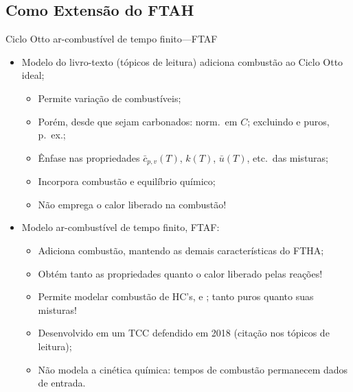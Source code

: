 \subsection{Como Extensão do FTAH}

    \begin{frame}{Ciclo Otto ar-combustível de tempo finito---FTAF}\vspace*{-2em}
        \begin{itemize}
            \item<1->  Modelo do livro-texto (tópicos de leitura) adiciona \alert{combustão} ao
                \alert{Ciclo Otto ideal};
            \begin{itemize}
                \item<2->  Permite variação de \alert{combustíveis};
                \item<3->  Porém, desde que sejam \alert{carbonados}: norm.~em $C$;
                    \alert{excluindo } e \alert{} puros, p.~ex.;
                \item<3->  Ênfase nas \alert{propriedades} $\bar{c}_{p,v}(T)$, $k(T)$,
                    $\bar{u}(T)$, etc.~das misturas;
                \item<4->  Incorpora \alert{combustão} e \alert{equilíbrio químico};
                \item<5->  \alert{Não emprega} o calor liberado na \alert{combustão}!
            \end{itemize}
            \item<6->  Modelo \alert{ar-combustível de tempo finito, FTAF}:
            \begin{itemize}
                \item<7->  Adiciona \alert{combustão}, mantendo as demais características do
                    \alert{FTHA};
                \item<8->  Obtém tanto as \alert{propriedades} quanto o \alert{calor liberado}
                    pelas \alert{reações}!
                \item<9->  \alert{Permite} modelar combustão de \alert{HC's}, \alert{} e
                    \alert{}; tanto \alert{puros} quanto suas \alert{misturas}!
                \item<10-> Desenvolvido em um \alert{TCC} defendido em \alert{2018} (citação nos
                    tópicos de leitura);
                \item<11-> \alert{Não} modela a cinética química: tempos de combustão permanecem
                    dados de \alert{entrada}.
            \end{itemize}
        \end{itemize}
    \end{frame}

